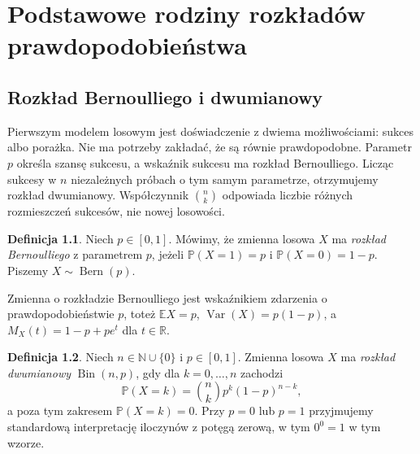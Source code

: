 \documentclass[11pt,a4paper,oneside]{report}
\numberwithin{equation}{chapter}
\theoremstyle{plain}
\theoremstyle{definition}
\newtheorem{definicja}{Definicja}[chapter]
\theoremstyle{remark}
\newcommand{\R}{\mathbb{R}}
\newcommand{\N}{\mathbb{N}}
\newcommand{\Prob}{\mathbb{P}}
\newcommand{\E}{\mathbb{E}}
\newcommand{\Var}{\operatorname{Var}}
\newcommand{\Bin}{\operatorname{Bin}}
\begin{document}
\chapter{Podstawowe rodziny rozkładów prawdopodobieństwa}
\label{ch:distributions}

\section{Rozkład Bernoulliego i dwumianowy}
Pierwszym modelem losowym jest doświadczenie z dwiema
możliwościami: sukces albo porażka. Nie ma potrzeby zakładać,
że są równie prawdopodobne. Parametr $p$ określa szansę sukcesu,
a wskaźnik sukcesu ma rozkład Bernoulliego. Licząc sukcesy
w $n$ niezależnych próbach o tym samym parametrze, otrzymujemy
rozkład dwumianowy. Współczynnik $\binom nk$ odpowiada
liczbie różnych rozmieszczeń sukcesów, nie nowej losowości.

\begin{definicja}
Niech $p\in[0,1]$. Mówimy, że zmienna losowa $X$ ma
\emph{rozkład Bernoulliego} z parametrem $p$, jeżeli
$\Prob(X=1)=p$ i $\Prob(X=0)=1-p$.
Piszemy $X\sim\operatorname{Bern}(p)$.
\end{definicja}

Zmienna o rozkładzie Bernoulliego jest wskaźnikiem zdarzenia
o prawdopodobieństwie $p$, toteż
$\E X=p$, $\Var(X)=p(1-p)$, a
$M_X(t)=1-p+pe^t$ dla $t\in\R$.

\begin{definicja}
Niech $n\in\N\cup\{0\}$ i $p\in[0,1]$.
Zmienna losowa $X$ ma \emph{rozkład dwumianowy} $\Bin(n,p)$,
gdy dla $k=0,\ldots,n$ zachodzi
\begin{equation}\label{eq:binomial}
\Prob(X=k)=\binom nk p^k(1-p)^{n-k},
\end{equation}
a poza tym zakresem $\Prob(X=k)=0$. Przy $p=0$ lub $p=1$
przyjmujemy standardową interpretację iloczynów z potęgą zerową,
w tym $0^0=1$ w tym wzorze.
\end{definicja}
\end{document}
